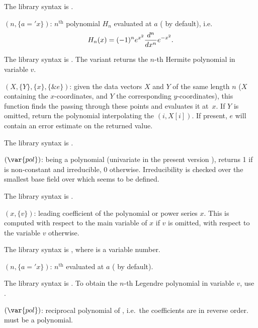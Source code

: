 The library syntax is .

$(n,\{a='x\})$: \label{se:polhermite}$n^{\text{th}}$  polynomial $H_n$ evaluated at $a$
( by default), i.e.
$$ H_n(x) = (-1)^n\*e^{x^2} \dfrac{d^n}{dx^n}e^{-x^2}.$$

The library syntax is .
The variant  returns the $n$-th
Hermite polynomial in variable $v$.

$(X,\{Y\},\{x\},\{\&e\})$: \label{se:polinterpolate}given the data vectors
$X$ and $Y$ of the same length $n$ ($X$ containing the $x$-coordinates,
and $Y$ the corresponding $y$-coordinates), this function finds the
 passing through these points and evaluates it
at~$x$. If $Y$ is omitted, return the polynomial interpolating the
$(i,X[i])$. If present, $e$ will contain an error estimate on the returned
value.

The library syntax is .

$(\var{pol})$: \label{se:polisirreducible} being a polynomial (univariate in the present version \vers),
returns 1 if  is non-constant and irreducible, 0 otherwise.
Irreducibility is checked over the smallest base field over which 
seems to be defined.

The library syntax is .

$(x,\{v\})$: \label{se:pollead}leading coefficient of the polynomial or power series $x$. This is
 computed with respect to the main variable of $x$ if $v$ is omitted, with
 respect to the variable $v$ otherwise.

The library syntax is , where  is a variable number.

$(n,\{a='x\})$: \label{se:pollegendre}$n^{\text{th}}$  evaluated at $a$ ( by
default).

The library syntax is .
To obtain the $n$-th Legendre polynomial in variable $v$,
use .

$(\var{pol})$: \label{se:polrecip}reciprocal polynomial of , i.e.~the coefficients are in
reverse order.  must be a polynomial.

